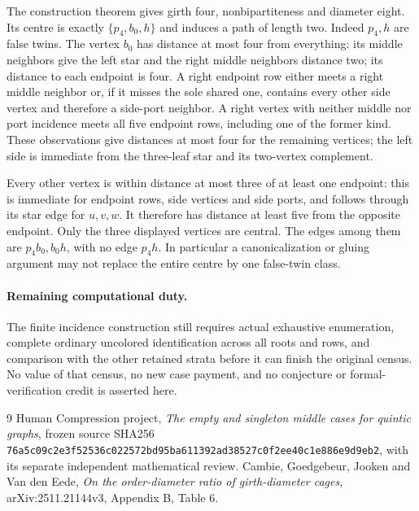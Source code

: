 \documentclass[11pt]{article}
\begin{document}
The construction theorem gives girth four, nonbipartiteness and diameter
eight. Its centre is exactly $\{p_4,b_0,h\}$ and induces a path of length
two. Indeed $p_4,h$ are false twins. The vertex $b_0$ has distance at
most four from everything: its middle neighbors give the left star and
the right middle neighbors distance two; its distance to each endpoint
is four. A right endpoint row either meets a right middle neighbor or,
if it misses the sole shared one, contains every other side vertex and
therefore a side-port neighbor. A right vertex with neither middle nor
port incidence meets all five endpoint rows, including one of the former
kind. These observations give distances at most four for the remaining
vertices; the left side is immediate from the three-leaf star and its
two-vertex complement.

Every other vertex is within distance at most three of at least one
endpoint: this is immediate for endpoint rows, side vertices and
side ports, and follows through its star edge for $u,v,w$. It therefore
has distance at least five from the opposite endpoint. Only the three
displayed vertices are central. The edges among them are
$p_4b_0,b_0h$, with no edge $p_4h$. In particular a canonicalization
or gluing argument may not replace the entire centre by one false-twin
class.

\paragraph{Remaining computational duty.}
The finite incidence construction still requires actual exhaustive
enumeration, complete ordinary uncolored identification across all roots
and rows, and comparison with the other retained strata before it can
finish the original census. No value of that census, no new case payment,
and no conjecture or formal-verification credit is asserted here.

\begin{thebibliography}{9}
 Human Compression project,
\emph{The empty and singleton middle cases for quintic graphs}, frozen
source SHA256 \texttt{76a5c09c2e3f52536c022572bd95ba611392ad38527c0f2ee40c1e886e9d9eb2},
with its separate independent mathematical review.
 Cambie, Goedgebeur, Jooken and Van den Eede,
\emph{On the order-diameter ratio of girth-diameter cages},
arXiv:2511.21144v3, Appendix B, Table 6.
\end{thebibliography}
\end{document}
